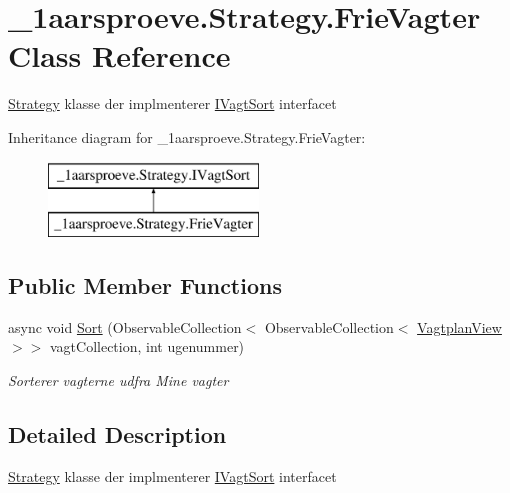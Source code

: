 \hypertarget{class__1aarsproeve_1_1_strategy_1_1_frie_vagter}{}\section{\+\_\+1aarsproeve.\+Strategy.\+Frie\+Vagter Class Reference}
\label{class__1aarsproeve_1_1_strategy_1_1_frie_vagter}


\hyperlink{namespace__1aarsproeve_1_1_strategy}{Strategy} klasse der implmenterer \hyperlink{interface__1aarsproeve_1_1_strategy_1_1_i_vagt_sort}{I\+Vagt\+Sort} interfacet  


Inheritance diagram for \+\_\+1aarsproeve.\+Strategy.\+Frie\+Vagter\+:\begin{figure}[H]
\begin{center}
\leavevmode
\includegraphics[height=2.000000cm]{class__1aarsproeve_1_1_strategy_1_1_frie_vagter}
\end{center}
\end{figure}
\subsection*{Public Member Functions}
\begin{DoxyCompactItemize}
\item 
async void \hyperlink{class__1aarsproeve_1_1_strategy_1_1_frie_vagter_ae1a30073de8aceb36378f7e7f2bd1e66}{Sort} (Observable\+Collection$<$ Observable\+Collection$<$ \hyperlink{class__1aarsproeve_1_1_model_1_1_vagtplan_view}{Vagtplan\+View} $>$$>$ vagt\+Collection, int ugenummer)
\begin{DoxyCompactList}\small\item\em Sorterer vagterne udfra Mine vagter \end{DoxyCompactList}\end{DoxyCompactItemize}


\subsection{Detailed Description}
\hyperlink{namespace__1aarsproeve_1_1_strategy}{Strategy} klasse der implmenterer \hyperlink{interface__1aarsproeve_1_1_strategy_1_1_i_vagt_sort}{I\+Vagt\+Sort} interfacet 



